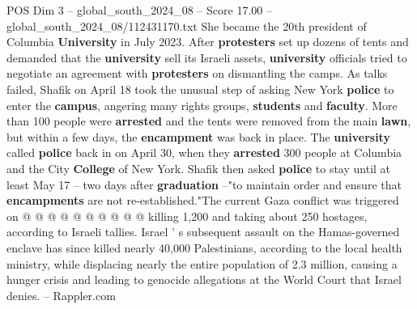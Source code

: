 \begin{textsample}{POS Dim 3 – global\_south\_2024\_08 – Score 17.00 – global\_south\_2024\_08/112431170.txt}
She became the 20th president of Columbia \textbf{University} in July 2023.
After \textbf{protesters} set up dozens of tents and demanded that the \textbf{university} sell its Israeli assets, \textbf{university} officials tried to negotiate an agreement with \textbf{protesters} on dismantling the camps.
As talks failed, Shafik on April 18 took the unusual step of asking New York \textbf{police} to enter the \textbf{campus}, angering many rights groups, \textbf{students} and \textbf{faculty}.
More than 100 people were \textbf{arrested} and the tents were removed from the main \textbf{lawn}, but within a few days, the \textbf{encampment} was back in place.
The \textbf{university} called \textbf{police} back in on April 30, when they \textbf{arrested} 300 people at Columbia and the City \textbf{College} of New York.
Shafik then asked \textbf{police} to stay until at least May 17 -- two days after \textbf{graduation} --"to maintain order and ensure that \textbf{encampments} are not re-established."The current Gaza conflict was triggered on @ @ @ @ @ @ @ @ @ @ killing 1,200 and taking about 250 hostages, according to Israeli tallies.
Israel ' s subsequent assault on the Hamas-governed enclave has since killed nearly 40,000 Palestinians, according to the local health ministry, while displacing nearly the entire population of 2.3 million, causing a hunger crisis and leading to genocide allegations at the World Court that Israel denies. -- Rappler.com

\end{textsample}
